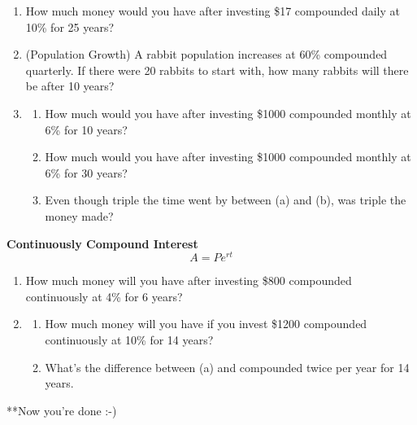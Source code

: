 \documentclass[12pt]{article}
\begin{document}
\begin{enumerate}[resume]

\item How much money would you have after investing \$17 compounded daily at 10\% for 25 years?\\

\item (Population Growth) A rabbit population increases at 60\% compounded quarterly. If there were 20 rabbits to start with, how many rabbits will there be after 10 years?\\

\item 	\begin{enumerate}

			\item How much would you have after investing \$1000 compounded monthly at 6\% for 10 years?\\

			\item How much would you have after investing \$1000 compounded monthly at 6\% for 30 years?\\
			
			\item Even though triple the time went by between (a) and (b), was triple the money made?\\

		\end{enumerate} 

\end{enumerate}

\hrulefill

\textbf{Continuously Compound Interest}\\

$$A=Pe^{rt}$$

\begin{enumerate}[resume]

\item How much money will you have after investing \$800 compounded continuously at 4\% for 6 years?\\

\vspace{1cm}

\item 	\begin{enumerate}
		
			\item How much money will you have if you invest \$1200 compounded continuously at 10\% for 14 years?\\
			
			\item What's the difference between (a) and compounded twice per year for 14 years.\\
			
		\end{enumerate}

\end{enumerate}

\vspace{1cm}

**Now you're done :-)
\end{document}
